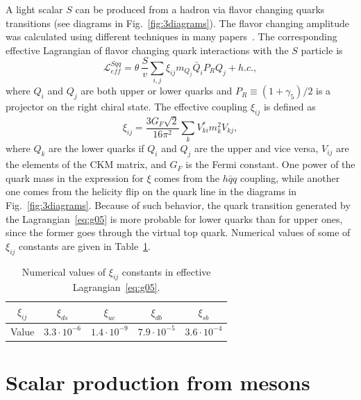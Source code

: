 \documentclass[a4paper,12pt,dvipsnames,usernames]{article}
\begin{document}
A light scalar $S$ can be produced from a hadron via flavor changing quarks transitions (see diagrams in Fig.~\ref{fig:3diagrams}). The flavor changing amplitude was calculated using different techniques in many papers~\cite{Willey:1982ti,Willey:1986mj,Grzadkowski:1983yp, Leutwyler:1989xj,Haber:1987ua,Chivukula:1988gp}. The corresponding effective Lagrangian of flavor changing quark interactions with the $S$ particle is
\begin{equation}
\label{eq:g05}
\mathcal{L}_{eff}^{Sqq}= \theta\ \frac{S}{v}\sum_{i,j}\xi_{ij}m_{Q_j}\bar{Q}_{i}P_{R}Q_{j}+h.c.,
\end{equation}
where $Q_i$ and $Q_j$ are both upper or lower quarks and $P_R \equiv (1+\gamma_{5})/2$ is a projector on the right chiral state. The effective coupling $\xi_{ij}$ is defined as
\begin{equation}
    \xi_{ij} = \frac{3G_{F}\sqrt{2}}{16\pi^{2}}\sum_{k}V_{ki}^{*}m_{k}^{2}V_{kj},
\end{equation}
where $Q_k$ are the lower quarks if $Q_i$ and $Q_j$ are the upper and vice versa, $V_{ij}$ are the elements of the CKM matrix, and $G_F$ is the Fermi constant. One power of the quark mass in the expression for $\xi$ comes from the $h\bar{q}q$ coupling, while another one comes from the helicity flip on the quark line in the diagrams in Fig.~\ref{fig:3diagrams}. Because of such behavior, the quark transition generated by the Lagrangian~\eqref{eq:g05} is more probable for lower quarks than for upper ones, since the former goes through the virtual top quark. Numerical values of some of $\xi_{ij}$ constants are given in Table~\ref{tab:xi}.
\begin{table}[h]
\centering
\begin{tabular}{|c|c|c|c|c|}
 \hline  
 $\xi_{ij}$  & $\xi_{ds}$ & $\xi_{uc}$ & $\xi_{db}$ & $\xi_{sb}$ \\
 \hline
 Value& $3.3 \cdot 10^{-6}$ & $1.4 \cdot 10^{-9}$  & $7.9 \cdot 10^{-5}$ & $3.6 \cdot 10^{-4}$\\
 \hline
\end{tabular}
    \caption{Numerical values of $\xi_{ij}$ constants in effective Lagrangian~\eqref{eq:g05}.}
    \label{tab:xi}
\end{table}

\section{Scalar production from mesons}
\label{sec:production-hadronic-decays}
\end{document}
